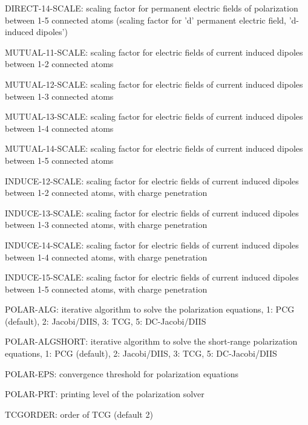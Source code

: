 \begin{DoxyItemize}
\begin{DoxyItemize}
\begin{DoxyItemize}
\item D\-I\-R\-E\-C\-T-\/14-\/\-S\-C\-A\-L\-E\-: scaling factor for permanent electric fields of polarization between 1-\/5 connected atoms (scaling factor for 'd' permanent electric field, 'd-\/induced dipoles')
\item M\-U\-T\-U\-A\-L-\/11-\/\-S\-C\-A\-L\-E\-: scaling factor for electric fields of current induced dipoles between 1-\/2 connected atoms
\item M\-U\-T\-U\-A\-L-\/12-\/\-S\-C\-A\-L\-E\-: scaling factor for electric fields of current induced dipoles between 1-\/3 connected atoms
\item M\-U\-T\-U\-A\-L-\/13-\/\-S\-C\-A\-L\-E\-: scaling factor for electric fields of current induced dipoles between 1-\/4 connected atoms
\item M\-U\-T\-U\-A\-L-\/14-\/\-S\-C\-A\-L\-E\-: scaling factor for electric fields of current induced dipoles between 1-\/5 connected atoms
\item I\-N\-D\-U\-C\-E-\/12-\/\-S\-C\-A\-L\-E\-: scaling factor for electric fields of current induced dipoles between 1-\/2 connected atoms, with charge penetration
\item I\-N\-D\-U\-C\-E-\/13-\/\-S\-C\-A\-L\-E\-: scaling factor for electric fields of current induced dipoles between 1-\/3 connected atoms, with charge penetration
\item I\-N\-D\-U\-C\-E-\/14-\/\-S\-C\-A\-L\-E\-: scaling factor for electric fields of current induced dipoles between 1-\/4 connected atoms, with charge penetration
\item I\-N\-D\-U\-C\-E-\/15-\/\-S\-C\-A\-L\-E\-: scaling factor for electric fields of current induced dipoles between 1-\/5 connected atoms, with charge penetration
\item P\-O\-L\-A\-R-\/\-A\-L\-G\-: iterative algorithm to solve the polarization equations, 1\-: P\-C\-G (default), 2\-: Jacobi/\-D\-I\-I\-S, 3\-: T\-C\-G, 5\-: D\-C-\/\-Jacobi/\-D\-I\-I\-S
\item P\-O\-L\-A\-R-\/\-A\-L\-G\-S\-H\-O\-R\-T\-: iterative algorithm to solve the short-\/range polarization equations, 1\-: P\-C\-G (default), 2\-: Jacobi/\-D\-I\-I\-S, 3\-: T\-C\-G, 5\-: D\-C-\/\-Jacobi/\-D\-I\-I\-S
\item P\-O\-L\-A\-R-\/\-E\-P\-S\-: convergence threshold for polarization equations
\item P\-O\-L\-A\-R-\/\-P\-R\-T\-: printing level of the polarization solver
\item T\-C\-G\-O\-R\-D\-E\-R\-: order of T\-C\-G (default 2)

\end{DoxyItemize}
\end{DoxyItemize}
\end{DoxyItemize}
